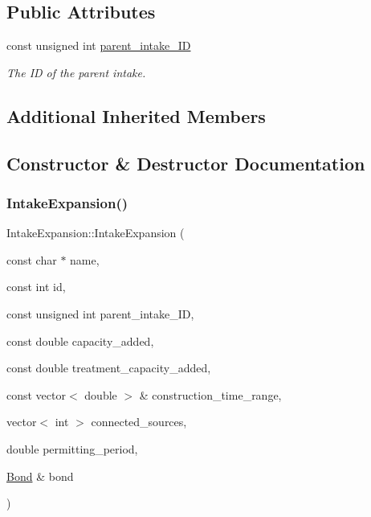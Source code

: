 \subsection*{Public Attributes}
\begin{DoxyCompactItemize}
\item 
const unsigned int \mbox{\hyperlink{classIntakeExpansion_a93569405968a66226046e730e691615c}{parent\+\_\+intake\+\_\+\+ID}}
\begin{DoxyCompactList}\small\item\em The ID of the parent intake. \end{DoxyCompactList}\end{DoxyCompactItemize}
\subsection*{Additional Inherited Members}


\subsection{Constructor \& Destructor Documentation}
\mbox{\label{classIntakeExpansion_abf871880367036c599caab901eb46339}} 
\subsubsection{\texorpdfstring{Intake\+Expansion()}{IntakeExpansion()}\hspace{0.1cm}{\footnotesize\ttfamily [1/2]}}
{\footnotesize\ttfamily Intake\+Expansion\+::\+Intake\+Expansion (\begin{DoxyParamCaption}\item[{const char $\ast$}]{name,  }\item[{const int}]{id,  }\item[{const unsigned int}]{parent\+\_\+intake\+\_\+\+ID,  }\item[{const double}]{capacity\+\_\+added,  }\item[{const double}]{treatment\+\_\+capacity\+\_\+added,  }\item[{const vector$<$ double $>$ \&}]{construction\+\_\+time\+\_\+range,  }\item[{vector$<$ int $>$}]{connected\+\_\+sources,  }\item[{double}]{permitting\+\_\+period,  }\item[{\mbox{\hyperlink{classBond}{Bond}} \&}]{bond }\end{DoxyParamCaption})}




